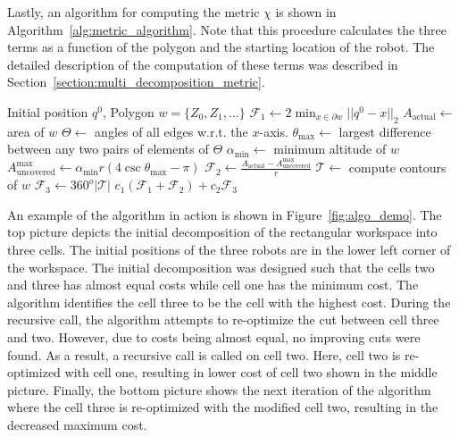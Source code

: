 \documentclass[../main.tex]{subfiles}
\begin{document}
Lastly, an algorithm for computing the metric $\chi$ is shown in Algorithm~\ref{alg:metric_algorithm}. Note that this procedure calculates the three terms as a function of the polygon and the starting location of the robot. The detailed description of the computation of these terms was described in Section~\ref{section:multi_decomposition_metric}.

\begin{algorithm}
	\caption{$\text{compute\_}\chi(q^0, w)$}
	\label{alg:metric_algorithm}
	\begin{algorithmic}[1]
		\REQUIRE Initial position $q^0$, Polygon $w=\{Z_0,Z_1,\ldots\}$ 
		\STATE $\mathcal{F}_1\gets2\min_{x\in\partial w}||q^0-x||_2$ \label{line:min_dist}
		\STATE $A_\text{actual}\gets$ area of $w$	\label{line:area}
		\STATE $\Theta\gets$ angles of all edges w.r.t. the $x$-axis.	\label{line:all_edge}
		\STATE $\theta_{\max}\gets$ largest difference between any two pairs of elements of $\Theta$ \label{line:all_pairs}
		\STATE $\alpha_{\min}\gets$ minimum altitude of $w$	\label{line:multi_alt}
		\STATE $A^{\max}_{\text{uncovered}}\gets\alpha_{\min}r(4\csc{\theta_{\max}}-\pi)$ \label{line:a_uncovered}
		\STATE $\mathcal{F}_2\gets\frac{A_\text{actual}-A^{\max}_{\text{uncovered}}}{r}$
		\STATE $\mathcal{T}\gets$ compute contours of $w$	\label{line:contours}
		\STATE $\mathcal{F}_3\gets360^o|\mathcal{T}|$
		\RETURN $c_1(\mathcal{F}_1+\mathcal{F}_2)+c_2\mathcal{F}_3$
	\end{algorithmic}
\end{algorithm}

An example of the algorithm in action is shown in Figure~\ref{fig:algo_demo}. The top picture depicts the initial decomposition of the rectangular workspace into three cells. The initial positions of the three robots are in the lower left corner of the workspace. The initial decomposition was designed such that the cells two and three has almost equal costs while cell one has the minimum cost. The algorithm identifies the cell three to be the cell with the highest cost. During the recursive call, the algorithm attempts to re-optimize the cut between cell three and two. However, due to costs being almost equal, no improving cuts were found. As a result, a recursive call is called on cell two. Here, cell two is re-optimized with cell one, resulting in lower cost of cell two shown in the middle picture. Finally, the bottom picture shows the next iteration of the algorithm where the cell three is re-optimized with the modified cell two, resulting in the decreased maximum cost. 
\end{document}

